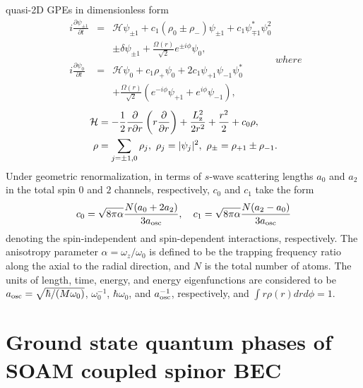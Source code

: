 \documentclass[pra,twocolumn,aps,superscriptaddress,showpacs,longbibliography]{revtex4-1}
\begin{document}
quasi-2D GPEs in dimensionless form
\begin{subequations}
\begin{eqnarray}
i\frac{\partial \psi_{\pm1}}{\partial t} &=&
\mathcal{H}\psi_{\pm1} +{c_1}(\rho_0  \pm \rho_{-})\psi_{\pm1}+{c_1}\psi_{\mp1}^*\psi_0^2  \nonumber \\
&&\pm \delta  \psi_{\pm1} +\frac{\Omega(r)}{\sqrt{2}} e^{\pm i \phi} \psi_0 ,\label{inter_gp2d-1}\\
i\frac{\partial \psi_0}{\partial t} &=&
\mathcal{H}\psi_0 +{c_1}\rho_{+}\psi_0+ 2{c_1}\psi_{+1}\psi_{-1}\psi_0^*
\nonumber\\
 &&+\frac{\Omega(r)}{\sqrt{2}} (e^{-i \phi} \psi_{+1} +e^{i \phi} \psi_{-1}),\label{inter_gp2d-2}
\end{eqnarray}
where
\end{subequations}
\begin{align} 
\mathcal{H} &=-\frac{1}{2}\frac{\partial}{r \partial r}\left(r\frac{\partial}{\partial r}\right)+\frac{L_{\rm z}^2}{2r^2}+ \frac{r^2}{2}+{c_0}\rho,\nonumber\\
\rho &= \sum_{j=\pm 1,0} \rho_j,~\rho_j = |\psi_j|^2,~\rho_{\pm}  = \rho_{+1}\pm\rho_{-1}.\nonumber\\
\end{align}
Under geometric renormalization, in terms of $s$-wave scattering lengths $a_0$ and $a_2$ in the total spin $0$ and $2$ channels, respectively, $c_0$ and $c_1$ take the form
\begin{equation}
c_0 = \sqrt{8\pi\alpha}\frac{N(a_0+2a_2)}{3{a_{\rm osc}}},\quad
c_1 = \sqrt{8\pi\alpha}\frac{N(a_2-a_0)}{3{a_{\rm osc}}} 
\label{interaction2d}
\end{equation}
denoting the spin-independent and spin-dependent interactions, respectively. The anisotropy parameter $\alpha= \omega_z/\omega_0$ is defined 
to be the trapping frequency ratio along the axial to the radial direction, and $N$ is the total number of atoms.  
The units of length, time, energy, and energy eigenfunctions are considered to be 
$a_{\rm osc} = \sqrt{\hbar/(M\omega_0)}$, $\omega_0^{-1}$, $\hbar\omega_0$, and $a_{\rm osc}^{-1}$, 
respectively, and $\int r\rho(r) drd\phi= 1$.
\section{Ground state quantum phases of SOAM coupled spinor BEC}
\label{Sec-III}
\end{document}
